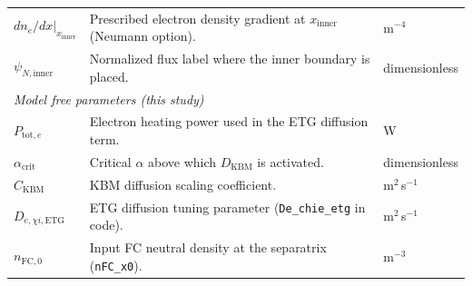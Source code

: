\documentclass[twocolumn,secnumarabic,amssymb, nobibnotes, aps, prd]{revtex4-2}
\begin{document}
\begin{table}[t]
\begin{ruledtabular}
\begin{tabular}{lll}
$\left.{dn_e}/{dx}\right|_{x_{\mathrm{inner}}}$ & Prescribed electron density gradient at $x_{\mathrm{inner}}$ (Neumann option). & m$^{-4}$ \\
$\psi_{N,\mathrm{inner}}$ & Normalized flux label where the inner boundary is placed. & dimensionless \\
\hline
\multicolumn{3}{l}{\textit{Model free parameters (this study)}} \\
$P_{\mathrm{tot},e}$ & Electron heating power used in the ETG diffusion term. & W \\
$\alpha_{\mathrm{crit}}$ & Critical $\alpha$ above which $D_{\mathrm{KBM}}$ is activated. & dimensionless \\
$C_{\mathrm{KBM}}$ & KBM diffusion scaling coefficient. & m$^2$\,s$^{-1}$ \\
$D_{e,\chi i,\mathrm{ETG}}$ & ETG diffusion tuning parameter (\texttt{De\_chie\_etg} in code). & m$^2$\,s$^{-1}$ \\
$n_{\mathrm{FC},0}$ & Input FC neutral density at the separatrix (\texttt{nFC\_x0}). & m$^{-3}$ \\
\end{tabular}
\end{ruledtabular}
\end{table}
\end{document}
